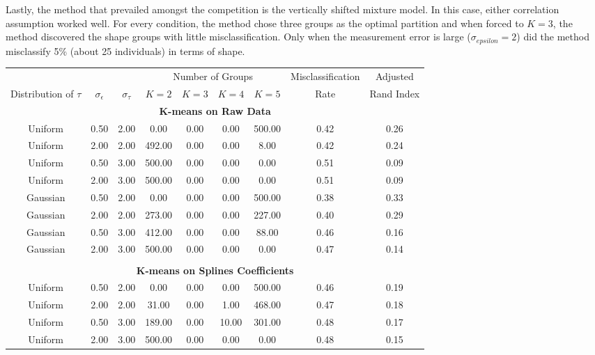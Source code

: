 Lastly, the method that prevailed amongst the competition is the vertically shifted mixture model. In this case, either correlation assumption worked well. For every condition, the method chose three groups as the optimal partition and when forced to $K=3$, the method discovered the shape groups with little misclassification. Only when the measurement error is large ($\sigma_{epsilon}=2$) did the method misclassify 5\% (about 25 individuals) in terms of shape. \\ 

\begin{table}[ht]
\begin{center}
\begin{tabular}{ccc|cccccc}
  \hline &&&\multicolumn{4}{c}{Number of Groups}&Misclassification&Adjusted\\ Distribution of $\tau$&$\sigma_{\epsilon}$&$\sigma_{\tau}$&$K=2$&$K=3$&$K=4$&$K=5$&Rate&Rand Index\\ \hline\multicolumn{9}{c}{\textbf{K-means on Raw Data}}\\ Uniform & 0.50 & 2.00 & 0.00 & 0.00 & 0.00 & 500.00 & 0.42 & 0.26 \\ 
  Uniform & 2.00 & 2.00 & 492.00 & 0.00 & 0.00 & 8.00 & 0.42 & 0.24 \\ 
  Uniform & 0.50 & 3.00 & 500.00 & 0.00 & 0.00 & 0.00 & 0.51 & 0.09 \\ 
  Uniform & 2.00 & 3.00 & 500.00 & 0.00 & 0.00 & 0.00 & 0.51 & 0.09 \\ 
  Gaussian & 0.50 & 2.00 & 0.00 & 0.00 & 0.00 & 500.00 & 0.38 & 0.33 \\ 
  Gaussian & 2.00 & 2.00 & 273.00 & 0.00 & 0.00 & 227.00 & 0.40 & 0.29 \\ 
  Gaussian & 0.50 & 3.00 & 412.00 & 0.00 & 0.00 & 88.00 & 0.46 & 0.16 \\ 
  Gaussian & 2.00 & 3.00 & 500.00 & 0.00 & 0.00 & 0.00 & 0.47 & 0.14 \\ 
   \\ \multicolumn{9}{c}{\textbf{K-means on Splines Coefficients}}\\Uniform & 0.50 & 2.00 & 0.00 & 0.00 & 0.00 & 500.00 & 0.46 & 0.19 \\ 
  Uniform & 2.00 & 2.00 & 31.00 & 0.00 & 1.00 & 468.00 & 0.47 & 0.18 \\ 
  Uniform & 0.50 & 3.00 & 189.00 & 0.00 & 10.00 & 301.00 & 0.48 & 0.17 \\ 
  Uniform & 2.00 & 3.00 & 500.00 & 0.00 & 0.00 & 0.00 & 0.48 & 0.15 \\ 

\end{tabular}
\end{center}
\end{table}
